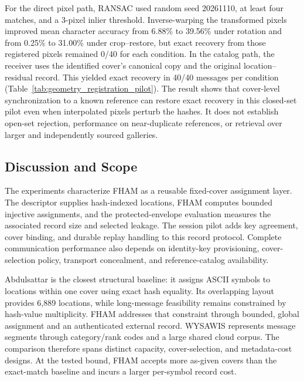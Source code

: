 \documentclass[preprint,12pt]{elsarticle}
\theoremstyle{plain}
\begin{document}
For the direct pixel path, RANSAC used random seed 20261110, at least four
matches, and a 3-pixel inlier threshold. Inverse-warping the transformed
pixels improved mean character accuracy from 6.88\% to 39.56\% under rotation
and from 0.25\% to 31.00\% under crop--restore, but exact recovery from those
registered pixels remained 0/40 for each condition. In the catalog path, the
receiver uses the identified cover's canonical copy and the original
location--residual record. This yielded exact recovery in 40/40 messages per
condition (Table~\ref{tab:geometry_registration_pilot}). The result shows
that cover-level synchronization to a known reference can restore exact
recovery in this closed-set pilot even when interpolated pixels perturb the
hashes. It does not establish open-set rejection, performance on near-duplicate
references, or retrieval over larger and independently sourced galleries.

\begin{table}[!t]
\centering
\small
\caption{Geometric pilot: closed-set cover identification in a 219-image gallery and message recovery over canonical references (40 messages per condition).}
\label{tab:geometry_registration_pilot}

\end{table}

\subsection{Discussion and Scope}

The experiments characterize FHAM as a reusable fixed-cover assignment layer.
The descriptor supplies hash-indexed locations, FHAM computes bounded
injective assignments, and the protected-envelope evaluation measures the
associated record size and selected leakage. The session pilot adds key
agreement, cover binding, and durable replay handling to this record protocol.
Complete communication performance also depends on identity-key provisioning,
cover-selection policy, transport concealment, and reference-catalog
availability.

Abdulsattar is the closest structural baseline: it assigns ASCII symbols to
locations within one cover using exact hash equality. Its overlapping layout
provides 6,889 locations, while long-message feasibility remains constrained by
hash-value multiplicity. FHAM addresses that constraint through bounded,
global assignment and an authenticated external record. WYSAWIS represents
message segments through category/rank codes and a large shared cloud corpus.
The comparison therefore spans distinct capacity, cover-selection, and
metadata-cost designs. At the tested bound, FHAM accepts more as-given covers
than the exact-match baseline and incurs a larger per-symbol record cost.
\end{document}
